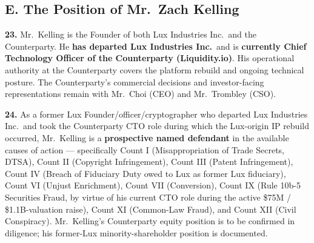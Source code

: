\documentclass[11pt,letterpaper]{article}
\begin{document}
\subsection*{E. The Position of Mr.\ Zach Kelling}

\textbf{23.} Mr.\ Kelling is the Founder of both Lux Industries
Inc.\ and the Counterparty. He \textbf{has departed Lux Industries
Inc.}\ and is \textbf{currently Chief Technology Officer of the
Counterparty (Liquidity.io)}. His operational authority at the
Counterparty covers the platform rebuild and ongoing technical
posture. The Counterparty's commercial decisions and investor-facing
representations remain with Mr.\ Choi (CEO) and Mr.\ Trombley (CSO).

\textbf{24.} As a former Lux Founder/officer/cryptographer who
departed Lux Industries Inc.\ and took the Counterparty CTO role
during which the Lux-origin IP rebuild occurred, Mr.\ Kelling is a
\textbf{prospective named defendant} in the available causes of
action --- specifically Count I (Misappropriation of Trade Secrets,
DTSA), Count II (Copyright Infringement), Count III (Patent
Infringement), Count IV (Breach of Fiduciary Duty owed to Lux as
former Lux fiduciary), Count VI (Unjust Enrichment), Count VII
(Conversion), Count IX (Rule 10b-5 Securities Fraud, by virtue of his
current CTO role during the active \$75M / \$1.1B-valuation raise),
Count XI (Common-Law Fraud), and Count XII (Civil Conspiracy).
Mr.\ Kelling's Counterparty equity position is to be confirmed in
diligence; his former-Lux minority-shareholder position is
documented.
\end{document}
